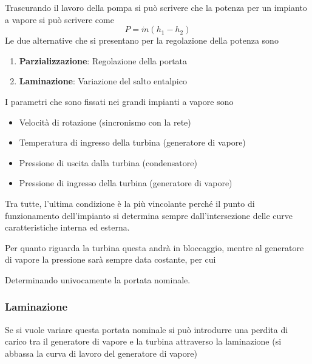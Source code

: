 \documentclass[a4paper, 15pt]{article}
\begin{document}
\begin{adjustwidth}{2in}{}
		
	Trascurando il lavoro della pompa si può scrivere che la potenza per un impianto a vapore si può scrivere come 
	\[P = \dot{m}(h_1-h_2)\]
	Le due alternative che si presentano per la regolazione della potenza sono
	\begin{enumerate}
		\item \textbf{Parzializzazione}: Regolazione della portata 
		\item \textbf{Laminazione}: Variazione del salto entalpico
	\end{enumerate}
	I parametri che sono fissati nei grandi impianti a vapore sono 
	\begin{itemize}
		\item Velocità di rotazione (sincronismo con la rete)
		\item Temperatura di ingresso della turbina (generatore di vapore)
		\item Pressione di uscita dalla turbina (condensatore)
		\item Pressione di ingresso della turbina (generatore di vapore)
	\end{itemize}
	Tra tutte, l'ultima condizione è la più vincolante perché il punto di funzionamento dell'impianto si determina sempre dall'intersezione delle curve caratteristiche interna ed esterna. 
	
	Per quanto riguarda la turbina questa andrà in bloccaggio, mentre al generatore di vapore la pressione sarà sempre data costante, per cui
	
	
	Determinando univocamente la portata nominale. 
	
	\subsubsection{Laminazione}
	Se si vuole variare questa portata nominale si può introdurre una perdita di carico tra il generatore di vapore e la turbina attraverso la laminazione (si abbassa la curva di lavoro del generatore di vapore) 
	

\end{adjustwidth}
\end{document}
